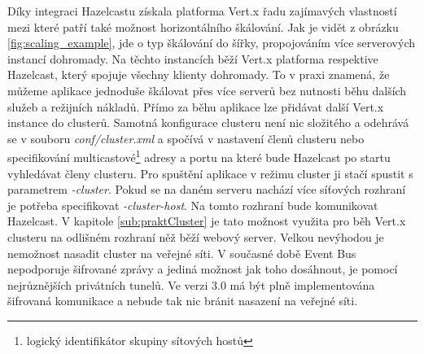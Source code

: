 Díky integraci Hazelcastu získala platforma Vert.x řadu zajímavých vlastností mezi které patří také možnost horizontálního škálování. Jak je vidět z obrázku \ref{fig:scaling_example}, jde o typ škálování do šířky, propojováním více serverových instancí dohromady. Na těchto instancích běží Vert.x platforma respektive Hazelcast, který spojuje všechny klienty dohromady. To v praxi znamená, že můžeme aplikace jednoduše škálovat přes více serverů bez nutnosti běhu dalších služeb a režijních nákladů. Přímo za běhu aplikace lze přidávat další Vert.x instance do clusterů. Samotná konfigurace clusteru není nic složitého a odehrává se v souboru \emph{conf/cluster.xml} a spočívá v nastavení členů clusteru nebo specifikování multicastové\footnote{logický identifikátor skupiny sítových hostů} adresy a portu na které bude Hazelcast po startu vyhledávat členy clusteru. Pro spuštění aplikace v režimu cluster ji stačí spustit s parametrem \emph{-cluster}. Pokud se na daném serveru nachází více síťových rozhraní je potřeba specifikovat \emph{-cluster-host}. Na tomto rozhraní bude komunikovat Hazelcast. V kapitole \ref{sub:praktCluster} je tato možnost využita pro běh Vert.x clusteru na odlišném rozhraní něž běží webový server.
Velkou nevýhodou je nemožnost nasadit cluster na veřejné síti. V současné době Event Bus nepodporuje šifrované zprávy a jediná možnost jak toho dosáhnout, je pomocí nejrůznějších privátních tunelů. Ve verzi 3.0 má být plně implementována šifrovaná komunikace a nebude tak nic bránit nasazení na veřejné síti.

